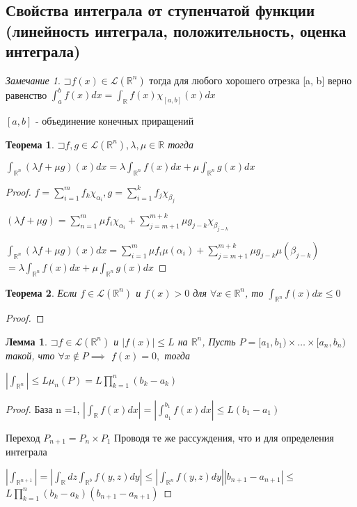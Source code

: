 \documentclass[a4paper]{article}
\newcommand\letsymbol{\mathord{\sqsupset}}
\newtheorem{theorem}{Теорема}[section]
\newtheorem{lemma}{Лемма}[section]
\theoremstyle{definition}
\theoremstyle{remark}
\newtheorem*{remark}{Замечание}
\begin{document}
    \subsection{ Свойства интеграла от ступенчатой функции (линейность интеграла, положительность, оценка интеграла)}
    \begin{remark}
     $\letsymbol{}f(x)\in \mathcal{L}(\mathbb{R} ^n)$ тогда для любого хорошего отрезка [a, b]
     верно равенство $\int_a^b f(x)dx = \int_\mathbb{R} f(x)\chi_{[a,b]}(x)dx$

     $[a,b]$ - объединение конечных приращений
\end{remark}
\begin{theorem}
     $\letsymbol{}f, g\in\mathcal{L}(\mathbb{R} ^n), \lambda, \mu \in \mathbb{R} $ 
     тогда

     $\int_{\mathbb{R}^n }(\lambda f + \mu g)(x)dx=\lambda\int_{\mathbb{R}^n }f(x)dx + \mu \int_{\mathbb{R}^n }g(x)dx$
\end{theorem}
\begin{proof}
     $f = \sum_{i = 1}^m f_k \chi_{\alpha_i}, g=\sum_{i = 1}^k f_j \chi_{\beta_j}$

     $(\lambda f + \mu g) = \sum_{n=1}^m \mu f_i \chi_{\alpha_i} + \sum_{j = m+1}^{m+k}\mu g_{j-k}\chi_{\beta_{j-k}}$

     $\int_{\mathbb{R} ^n} (\lambda f + \mu g)(x)dx = \sum_{i=1}^m \mu f_i \mu(\alpha_i)+ \sum_{j = m+1}^{m+k}\mu g_{j-k}\mu(\beta_{j-k})$
    $=\lambda\int_{\mathbb{R} ^n}f(x)dx + \mu\int_{\mathbb{R} ^n}g(x)dx$ 

\end{proof}
\begin{theorem}
     Если $f\in\mathcal{L}(\mathbb{R} ^n)$ и $f(x)>0$ для $\forall x\in\mathbb{R} ^n$, то 
     $\int_{\mathbb{R} ^n} f(x)dx\leq 0$
\end{theorem}
\begin{proof}
\end{proof}
\begin{lemma}
     $\letsymbol{}f \in \mathcal{L}(\mathbb{R} ^n)$ и $|f(x)|\leq L$ на $\mathbb{R} ^n$, Пусть 
     $P = [a_1, b_1)\times\dots\times[a_n, b_n)$ такой, что $\forall x\notin P \implies$
     $f(x) = 0,$ тогда 

     $|\int_{\mathbb{R} ^n}|\leq L \mu_n(P) = L \prod_{k = 1}^n (b_k - a_k)$
\end{lemma}
\begin{proof}
     База n =1, $|\int_\mathbb{R} f(x)dx| = |\int_{a_1}^{b_1}f(x)dx|\leq L(b_1 - a_1)$

     Переход $P_{n+1} = P_n \times P_1$
     Проводя те же рассуждения, что и для определения интеграла

     $|\int_{\mathbb{R} ^{n+1}}| = |\int_{\mathbb{R} }dz \int_{\mathbb{R} ^b}f(y, z)dy| \leq|\int_{\mathbb{R} ^n} f(y, z) dy||b_{n+1} - a_{n+1}|\leq$
     $L\prod_{k=1}^n (b_k-a_k)(b_{n+1} - a_{n+1})$
\end{proof}
\end{document}
